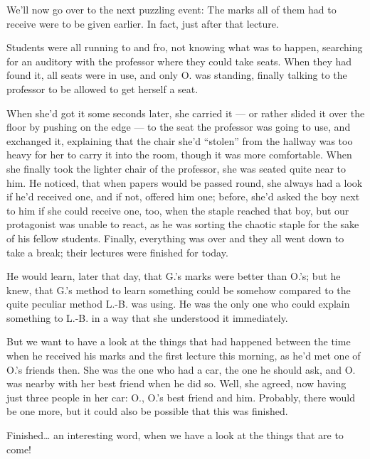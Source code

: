 We'll now go over to the next puzzling event: The marks all of them had to receive were to be given earlier. 
In fact, just after that lecture.

Students were all running to and fro, not knowing what was to happen, searching for an auditory with the professor where they could take seats. 
When they had found it, all seats were in use, and only O. was standing, finally talking to the professor to be allowed to get herself a seat.

When she'd got it some seconds later, she carried it --- or rather slided it over the floor by pushing on the edge --- to the seat the professor was going to use, and exchanged it, explaining that the chair she'd \enquote{stolen} from the hallway was too heavy for her to carry it into the room, though it was more comfortable. When she finally took the lighter chair of the professor, she was seated quite near to him. 
He noticed, that when papers would be passed round, she always had a look if he'd received one, and if not, offered him one; before, she'd asked the boy next to him if she could receive one, too, when the staple reached that boy, but our protagonist was unable to react, as he was sorting the chaotic staple for the sake of his fellow students. 
Finally, everything was over and they all went down to take a break; their lectures were finished for today.

He would learn, later that day, that G.'s marks were better than O.'s; but he knew, that G.'s method to learn something could be somehow compared to the quite peculiar method L.-B. was using. He was the only one who could explain something to L.-B. in a way that she understood it immediately.

But we want to have a look at the things that had happened between the time when he received his marks and the first lecture this morning, as he'd met one of O.'s friends then. 
She was the one who had a car, the one he should ask, and O. was nearby with her best friend when he did so. Well, she agreed, now having just three people in her car: O., O.'s best friend and him. Probably, there would be one more, but it could also be possible that this was finished.

Finished\ldots
an interesting word, when we have a look at the things that are to come!

